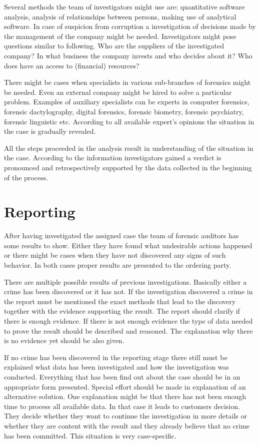 Several methods the team of investigators might use are: quantitative software analysis, analysis of relationships between persons, making use of analytical software. In case of  suspicion from corruption a investigation of decisions made by the management of the company might be needed. Investigators might pose questions similar to following. Who are the suppliers of the investigated company? In what business the company invests and who decides about it? Who does have an access to (financial) resources?


There might be cases when specialists in various sub-branches of forensics might be needed. Even an external company might be hired to solve a particular problem. Examples of auxiliary specialists can be experts in computer forensics, forensic dactylography, digital forensics, forensic biometry, forensic psychiatry, forensic linguistic etc. According to all available expert's opinions the situation in the case is gradually revealed.

All the steps proceeded in the analysis result in understanding of the situation in the case. According to the information investigators gained a verdict is pronounced and retrospectively supported by the data collected in the beginning of the process. 

\section{Reporting}

After having investigated the assigned case the team of forensic auditors has some results to show. Either they have found what undesirable actions happened or there might be cases when they have not discovered any signs of such behavior. In both cases proper results are presented to the ordering party. 




There are multiple possible results of previous investigations. Basically either a crime has been discovered or it has not. If the investigation discovered a crime in the report must be mentioned the exact methods that lead to the discovery together with the evidence supporting the result. The report should clarify if there is enough evidence. If there is not enough evidence the type of data needed to prove the result should be described and reasoned. The explanation why there is no evidence yet should be also given.


If no crime has been discovered in the reporting stage there still must be explained what data has been investigated and how the investigation was conducted. Everything that has been find out about the case should be in an appropriate form presented. Special effort should be made in explanation of an alternative solution. One explanation might be that there has not been enough time to process all available data. In that case it leads to customers decision. They decide whether they want to continue the investigation in more details or whether they are content with the result and they already believe that no crime has been committed. This situation is very case-specific. 

